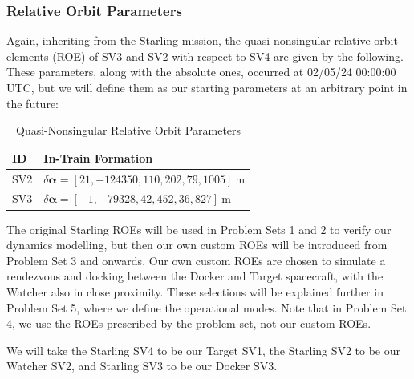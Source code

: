 \subsubsection{Relative Orbit Parameters}\label{sec:ROE_init}
Again, inheriting from the Starling mission, the quasi-nonsingular relative orbit elements (ROE) of SV3 and SV2 with respect to SV4 are given by the following. These parameters, along with the absolute ones, occurred at 02/05/24 00:00:00 UTC, but we will define them as our starting parameters at an arbitrary point in the future: 
\begin{table}[h!]
\centering
\begin{tabular}{ll}
\toprule
\textbf{ID} & \textbf{In-Train Formation} \\
\midrule
SV2 & $\delta\boldsymbol{\alpha} = [21, -124350, 110, 202, 79, 1005]~\text{m}$ \\
SV3 & $\delta\boldsymbol{\alpha} = [-1, -79328, 42, 452, 36, 827]~\text{m}$ \\
\bottomrule
\end{tabular}
\caption{Quasi-Nonsingular Relative Orbit Parameters}
\label{tab:relative_oe}
\end{table}

The original Starling ROEs will be used in Problem Sets 1 and 2 to verify our dynamics modelling, but then our own custom ROEs will be introduced from Problem Set 3 and onwards. Our own custom ROEs are chosen to simulate a rendezvous and docking between the Docker and Target spacecraft, with the Watcher also in close proximity. These selections will be explained further in Problem Set 5, where we define the operational modes. Note that in Problem Set 4, we use the ROEs prescribed by the problem set, not our custom ROEs. 

We will take the Starling SV4 to be our Target SV1, the Starling SV2 to be our Watcher SV2, and Starling SV3 to be our Docker SV3. 

